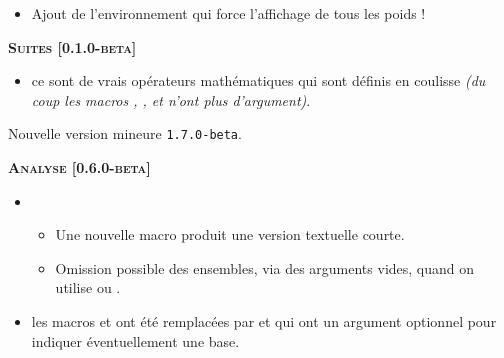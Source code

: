 \documentclass[12pt,a4paper]{book}
\begin{document}
\begin{description}
\begin{itemize}[itemsep=.5em]
\begin{itemize}[itemsep=.5em]
        \item Ajout de l'environnement  qui force l'affichage de tous les poids !
    \end{itemize}
\end{itemize}


\separation




\begin{center}
    \textbf{\textsc{Suites [0.1.0-beta]}}
\end{center}

\begin{itemize}[itemsep=.5em]
    \item {}
          ce sont de vrais opérateurs mathématiques qui sont définis en coulisse \emph{(du coup les macros , ,  et  n'ont plus d'argument)}.   
\end{itemize}


\separation

\end{description}\begin{description}
\medskip
\item[2020-08-06] Nouvelle version mineure \verb+1.7.0-beta+.




\begin{center}
    \textbf{\textsc{Analyse [0.6.0-beta]}}
\end{center}

\begin{itemize}[itemsep=.5em]
    \item {}
    \begin{itemize}[itemsep=.5em]
        \item Une nouvelle macro  produit une version textuelle courte.

        \item Omission possible des ensembles, via des arguments vides, quand on utilise  ou .
    \end{itemize}


    \item {}
          les macros  et  ont été remplacées par  et  qui ont un argument optionnel pour indiquer éventuellement une base.


\end{itemize}
\end{description}
\end{document}
